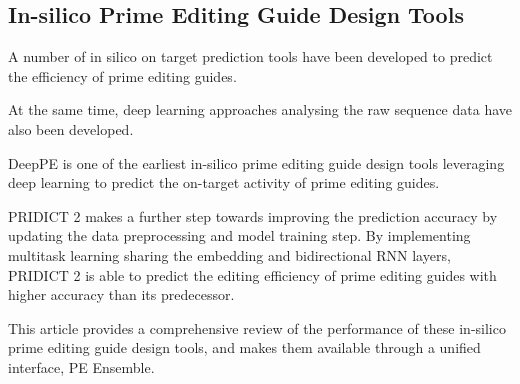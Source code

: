 \subsection*{In-silico Prime Editing Guide Design Tools}

A number of in silico on target prediction tools have been developed to predict the efficiency of prime editing guides. 

At the same time, deep learning approaches analysing the raw sequence data have also been developed.

DeepPE is one of the earliest in-silico prime editing guide design tools leveraging deep learning to predict the on-target activity of prime editing guides\cite{kimPredictingEfficiencyPrime2021}.

PRIDICT 2 makes a further step towards improving the prediction accuracy by updating the data preprocessing and model training step. By implementing multitask learning sharing the embedding and bidirectional RNN layers, PRIDICT 2 is able to predict the editing efficiency of prime editing guides with higher accuracy than its predecessor\cite{mathisMachineLearningPrediction2024}. 

This article provides a comprehensive review of the performance of these in-silico prime editing guide design tools, and makes them available through a unified interface, PE Ensemble.

\begin{figure}
    
\end{figure}